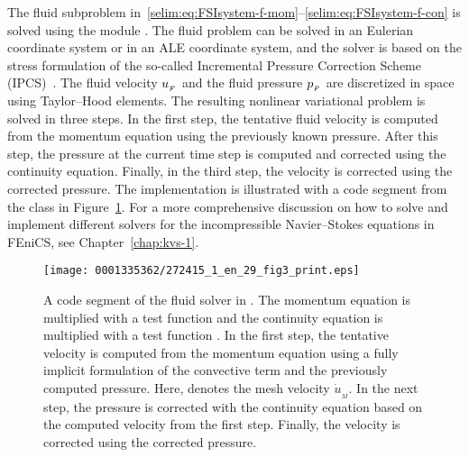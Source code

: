 The fluid subproblem in~\eqref{selim:eq:FSIsystem-f-mom}--\eqref{selim:eq:FSIsystem-f-con} is solved using the
 module . The fluid problem can be
solved in an Eulerian coordinate system or in an ALE coordinate
system, and the solver is based on the stress formulation of the
so-called Incremental Pressure Correction Scheme
(IPCS)~\citep{Goda1979}. The fluid velocity $u_{_{F}}$ and the fluid
pressure $p_{_{F}}$ are discretized in space using Taylor--Hood
elements. The resulting nonlinear variational problem is solved in
three steps. In the first step, the tentative fluid velocity is
computed from the momentum equation using the previously known
pressure. After this step, the pressure at the current time step is
computed and corrected using the continuity equation. Finally, in the
third step, the velocity is corrected using the corrected pressure.
The implementation is illustrated with a code segment from the class
 in Figure~\ref{selim:fig:fluidsolver}. For a
more comprehensive discussion on how to solve and implement different
solvers for the incompressible Navier--Stokes equations in FEniCS, see
Chapter~\ref{chap:kvs-1}.
\begin{figure}[!t]
\texttt{[image: 0001335362/272415\_1\_en\_29\_fig3\_print.eps]}
\caption{A code segment of the fluid solver in . The
  momentum equation is multiplied with a test function  and
  the continuity equation is multiplied with a test function
  . In the first step, the tentative velocity is computed
  from the momentum equation using a fully implicit formulation of the
  convective term and the previously computed pressure. Here, 
  denotes the mesh velocity $\dot{u}_{_{M}}$. In the next step, the
  pressure is corrected with the continuity equation based on the
  computed velocity  from the first step. Finally, the
  velocity is corrected using the corrected pressure.}
\label{selim:fig:fluidsolver}
\end{figure}

